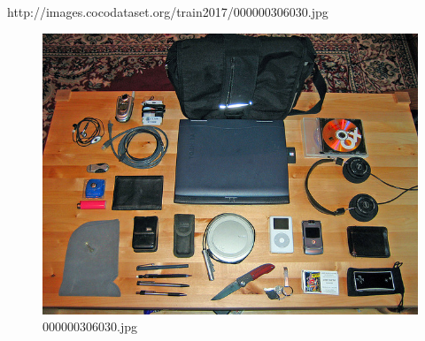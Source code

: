 http://images.cocodataset.org/train2017/000000306030.jpg
\begin{figure}[h]
    \centering
    \includegraphics[width=0.8\linewidth]{../image set/hard/000000306030.jpg}
    \caption{000000306030.jpg}
\end{figure}
